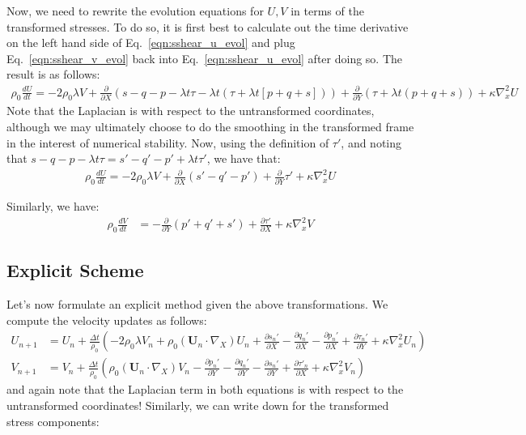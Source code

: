 \documentclass[11pt]{article}
\newcommand{\p}{\partial}
\begin{document}
Now, we need to rewrite the evolution equations for $U, V$ in terms of the transformed stresses. To do so, it is first best to calculate out the time derivative on the left hand side of Eq.~\ref{eqn:sshear_u_evol} and plug Eq.~\ref{eqn:sshear_v_evol} back into Eq.~\ref{eqn:sshear_u_evol} after doing so. The result is as follows:
\begin{align}
    \rho_0 \frac{dU}{dt} = -2\rho_0 \lambda V + \frac{\p}{\p X}\left(s - q - p - \lambda t \tau - \lambda t (\tau + \lambda t [p + q + s])\right) + \frac{\p}{\p Y}\left(\tau + \lambda t (p + q + s)\right) + \kappa \nabla_x^2 U
    \nonumber
\end{align}
Note that the Laplacian is with respect to the untransformed coordinates, although we may ultimately choose to do the smoothing in the transformed frame in the interest of numerical stability. Now, using the definition of $\tau'$, and noting that $s-q-p-\lambda t \tau = s' - q' - p' + \lambda t \tau'$, we have that:
\begin{align}
    \rho_0\frac{dU}{dt} = -2\rho_0\lambda V + \frac{\p}{\p X}(s' - q' - p') + \frac{\p}{\p Y}\tau' + \kappa\nabla_x^2 U
    \label{eqn:sshear_u_evol_final}
\end{align}

Similarly, we have:
\begin{align}
    \rho_0\frac{dV}{dt} &= -\frac{\p}{\p Y}\left(p' + q' + s'\right) + \frac{\p\tau'}{\p X} + \kappa \nabla_x^2 V
    \label{eqn:sshear_v_evol_final}
\end{align}
\subsection*{Explicit Scheme}
Let's now formulate an explicit method given the above transformations. We compute the velocity updates as follows:
\begin{align}
    U_{n+1} &= U_n + \frac{\Delta t}{\rho_0}\left(-2\rho_0\lambda V_n + \rho_0 \left( \mathbf{U}_n \cdot \nabla_X \right) U_n + \frac{\p s_n'}{\p X} - \frac{\p q_n'}{\p X} - \frac{\p p_n'}{\p X} + \frac{\p \tau_n'}{\p Y} + \kappa \nabla^2_x U_n \right)\\
    V_{n+1} &= V_n + \frac{\Delta t}{\rho_0}\left( \rho_0 \left( \mathbf{U}_n \cdot \nabla_X \right) V_n - \frac{\p p_n'}{\p Y} - \frac{\p q_n'}{\p Y} - \frac{\p s_n'}{\p Y} + \frac{\p \tau'_n}{\p X} + \kappa \nabla_x^2 V_n\right)
    \label{eqn:sshear_velocity_explicit}
\end{align}
and again note that the Laplacian term in both equations is with respect to the untransformed coordinates! Similarly, we can write down for the transformed stress components:
\end{document}
